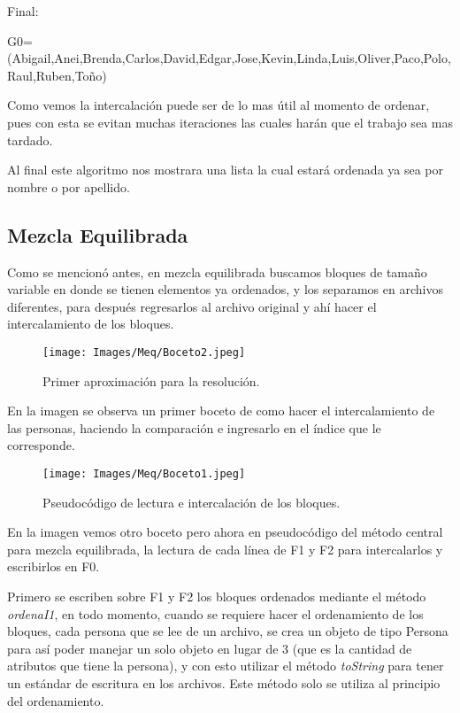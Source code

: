 \documentclass[letter]{report}
\begin{document}
Final:

G0=(Abigail,Anei,Brenda,Carlos,David,Edgar,Jose,Kevin,Linda,Luis,Oliver,Paco,Polo,Raul,Ruben,Toño)\medskip\medskip

Como vemos la intercalación puede ser de lo mas útil al momento de ordenar, pues con esta se evitan muchas iteraciones las cuales harán que el trabajo sea mas tardado.\medskip

Al final este algoritmo nos mostrara una lista la cual estará ordenada ya sea por nombre o por apellido.\medskip



\clearpage
{}
\subsection*{Mezcla Equilibrada}
Como se mencionó antes, en mezcla equilibrada buscamos bloques de tamaño variable en donde se tienen elementos ya ordenados, y los separamos en archivos diferentes, para después regresarlos al archivo original y ahí hacer el intercalamiento de los bloques.

\begin{figure}[h!]
    \centering
    \texttt{[image: Images/Meq/Boceto2.jpeg]}
    \caption{Primer aproximación para la resolución.}
\end{figure}

En la imagen se observa un primer boceto de como hacer el intercalamiento de las personas, haciendo la comparación e ingresarlo en el índice que le corresponde.

\clearpage
\begin{figure}[h]
    \centering
    \texttt{[image: Images/Meq/Boceto1.jpeg]}
    \caption{Pseudocódigo de lectura e intercalación de los bloques.}
\end{figure}

En la imagen vemos otro boceto pero ahora en pseudocódigo del método central para mezcla equilibrada, la lectura de cada línea de F1 y F2 para intercalarlos y escribirlos en F0.\medskip

Primero se escriben sobre F1 y F2 los bloques ordenados mediante el método \textit{ordenaI1}, en todo momento, cuando se requiere hacer el ordenamiento de los bloques, cada persona que se lee de un archivo, se crea un objeto de tipo Persona para así poder manejar un solo objeto en lugar de 3 (que es la cantidad de atributos que tiene la persona), y con esto utilizar el método \textit{toString} para tener un estándar de escritura en los archivos. Este método solo se utiliza al principio del ordenamiento.\medskip
\end{document}
